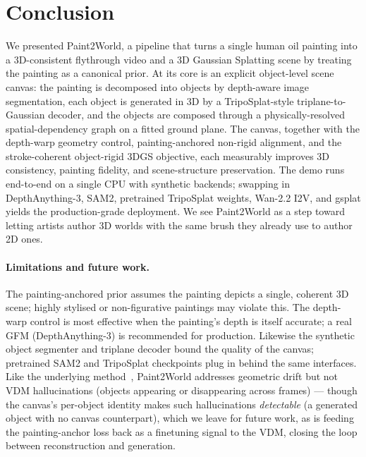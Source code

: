 \documentclass[10pt,twocolumn,letterpaper]{article}
\begin{document}
\section{Conclusion}
\label{sec:conclusion}

We presented Paint2World, a pipeline that turns a single human oil painting
into a 3D-consistent flythrough video and a 3D Gaussian Splatting scene by
treating the painting as a canonical prior. At its core is an explicit
object-level scene canvas: the painting is decomposed into objects by
depth-aware image segmentation, each object is generated in 3D by a
TripoSplat-style triplane-to-Gaussian decoder, and the objects are composed
through a physically-resolved spatial-dependency graph on a fitted ground
plane. The canvas, together with the depth-warp geometry control,
painting-anchored non-rigid alignment, and the stroke-coherent object-rigid
3DGS objective, each measurably improves 3D consistency, painting fidelity,
and scene-structure preservation. The demo runs end-to-end on a single CPU
with synthetic backends; swapping in DepthAnything-3, SAM2, pretrained
TripoSplat weights, Wan-2.2 I2V, and gsplat yields the production-grade
deployment. We see Paint2World as a step toward letting artists author 3D
worlds with the same brush they already use to author 2D ones.

\paragraph{Limitations and future work.}
The painting-anchored prior assumes the painting depicts a single, coherent
3D scene; highly stylised or non-figurative paintings may violate this. The
depth-warp control is most effective when the painting's depth is itself
accurate; a real GFM (DepthAnything-3) is recommended for production.
Likewise the synthetic object segmenter and triplane decoder bound the
quality of the canvas; pretrained SAM2 and TripoSplat checkpoints plug in
behind the same interfaces. Like the underlying
method~\cite{hoellein2026worldreconstruction}, Paint2World addresses
geometric drift but not VDM hallucinations (objects appearing or disappearing
across frames) --- though the canvas's per-object identity makes such
hallucinations \emph{detectable} (a generated object with no canvas
counterpart), which we leave for future work, as is feeding the
painting-anchor loss back as a finetuning signal to the VDM, closing the
loop between reconstruction and generation.

{\small


}
\end{document}
